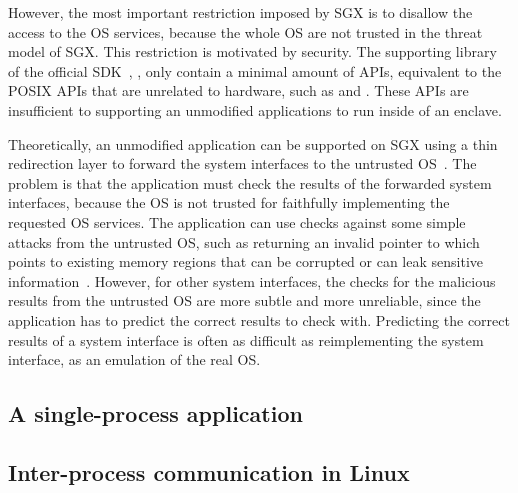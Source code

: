 However, the most important restriction imposed by SGX is
to disallow the access to the OS services, 
because the whole OS are not trusted in the threat model of SGX.
This restriction is motivated by security. 
The supporting library of the official SDK~\cite{intel-sgx-sdk}, , only contain a minimal amount of APIs, equivalent to the POSIX APIs that are unrelated to hardware, 
such as  and .
These APIs are insufficient to supporting an unmodified applications to run inside of an enclave. 


Theoretically, an unmodified application can be supported on SGX using a thin redirection layer to forward the system interfaces to the untrusted OS~\cite{osdi16scone,shinde17panoply}.
The problem is that the application must check the results of the forwarded system interfaces, because the OS is not trusted for faithfully implementing the requested OS services.
The application can use checks against some simple attacks
from the untrusted OS, such as returning an invalid pointer to  which points to existing memory regions that can be corrupted or can leak sensitive information~\cite{checkoway13iago}.
However, for other system interfaces, the checks for the malicious results from the untrusted OS are more subtle and more unreliable,
since the application has to predict the correct results to check with.
Predicting the correct results of a system interface is often
as difficult as reimplementing the system interface, as an emulation of the real OS.


\subsection{A single-process application}





\subsection{Inter-process communication in Linux}



